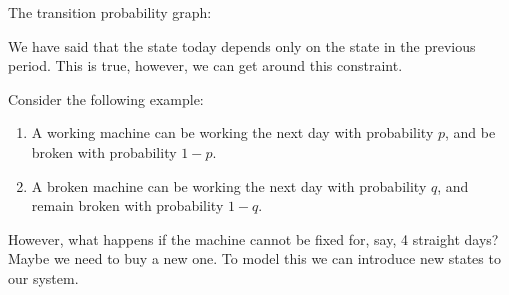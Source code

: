 \documentclass[aspectratio=169]{beamer}
\begin{document}
\begin{frame}
        The transition probability graph:

        \vspace{0.5em}

        \begin{center}
        \end{center}
    

\end{frame}

\begin{frame}
    We have said that the state today depends only on the state in the previous period.
    This is true, however, we can get around this constraint.
    
    \vspace{1em}

    Consider the following example:
    \begin{enumerate}
        \item A working machine can be working the next day with probability $p$, and be broken with probability $1-p$.
        \item A broken machine can be working the next day with probability $q$, and remain broken with probability $1-q$.
    \end{enumerate}

    \vspace{1em}

    However, what happens if the machine cannot be fixed for, say, 4 straight days? Maybe we need to buy a new one. To model this
    we can introduce new states to our system.

\end{frame}
\end{document}
